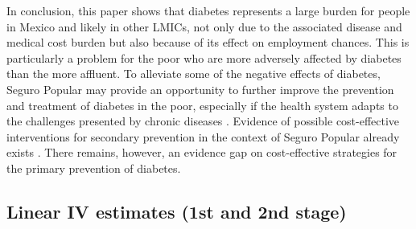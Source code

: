 In conclusion, this paper shows that diabetes represents
a large burden for people in Mexico and likely in other \acp{LMIC},
not only due to the associated disease and medical cost burden but
also because of its effect on employment chances. This is particularly
a problem for the poor who are more adversely affected by diabetes
than the more affluent. To alleviate some of the negative effects
of diabetes, Seguro Popular may provide an opportunity to further improve
the prevention and treatment of diabetes in the poor, especially if
the health system adapts to the challenges presented by chronic diseases
\parencite{Samb2010}. Evidence of possible cost-effective interventions
for secondary prevention in the context of Seguro Popular already
exists \parencite{Salomon2012}. There remains, however, an evidence gap
on cost-effective strategies for the primary prevention of diabetes.

\clearpage

\subsection*{\label{sec:Lewbel-and-linear}Linear IV estimates (1st and 2nd stage)}


